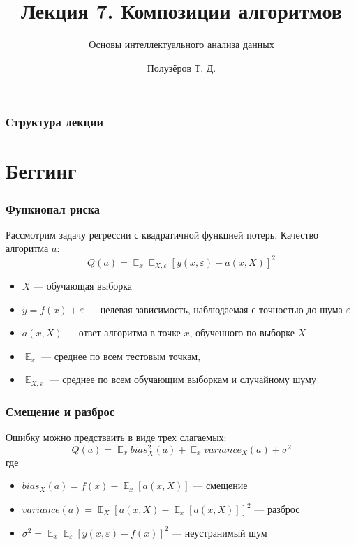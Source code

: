 \documentclass{beamer}
\title[Ансамбли]{Лекция 7. Композиции алгоритмов}
\subtitle{Основы интеллектуального анализа данных}
\author{Полузёров Т. Д.}
\institute{БГУ ФПМИ}
\date{}
\newcommand{\eps}{\varepsilon}
\DeclareMathOperator{\E}{\mathbb{E}}
\begin{document}
	
	\begin{frame}
		\titlepage
	\end{frame}
	
	
	\begin{center}
		\frametitle{Структура лекции}
		\tableofcontents
	\end{center}
	
	\section{Беггинг}

	\begin{frame}
		\frametitle{Функионал риска}
		Рассмотрим задачу регрессии с квадратичной функцией потерь. Качество алгоритма $a$:
		\[
		Q(a) = \E_x \E_{X, \eps} [y(x, \eps) - a(x, X)]^{2}
		\]

		\begin{itemize}
			\item $X$ --- обучающая выборка
			\item $y = f(x) + \eps$ --- целевая зависимость, наблюдаемая с точностью до шума $\eps$
			\item $a(x, X)$ --- ответ алгоритма в точке $x$, обученного по выборке $X$
			\item $\E_x$ --- среднее по всем тестовым точкам, 
			\item $\E_{X, \eps}$ --- среднее по всем обучающим выборкам и случайному шуму
		\end{itemize}
	\end{frame}

	\begin{frame}
		\frametitle{Смещение и разброс}
		
		Ошибку можно предстваить в виде трех слагаемых:
		\[
		Q(a) = \E_x bias_X^2 (a) + 
		\E_x variance_X (a)
		+ \sigma^2
		\]
		где
		\begin{itemize}
			\item $bias_X(a) = f(x) - \E_x [a(x, X)]$ --- смещение
			\item $variance(a) = \E_X [ a(x, X) - \E_x[a(x, X)] ]^2$ --- разброс
			\item $\sigma^2 = \E_x \E_{\eps} [y(x, \eps) - f(x)]^2$ --- неустранимый шум
		\end{itemize}
	\end{frame}
\end{document}
